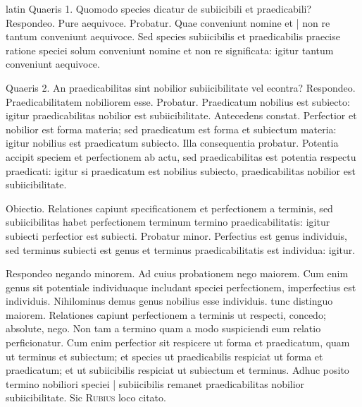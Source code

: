 \begin{otherlanguage*}{latin}
\pstart
 Quaeris 1. Quomodo species dicatur de subiicibili et praedicabili? Respondeo. Pure aequivoce. Probatur. Quae conveniunt nomine et \textnormal{|}   non re tantum conveniunt aequivoce. Sed species subiicibilis et praedicabilis praecise ratione speciei solum conveniunt nomine et non re significata: igitur tantum conveniunt aequivoce. 
\pend

\pstart
 Quaeris 2. An praedicabilitas sint nobilior subiicibilitate vel econtra? Respondeo. Praedicabilitatem nobiliorem esse. Probatur. Praedicatum nobilius est subiecto: igitur praedicabilitas nobilior est subiicibilitate. Antecedens constat. Perfectior et nobilior est forma materia; sed praedicatum est forma et subiectum materia: igitur nobilius est praedicatum subiecto. Illa consequentia probatur. Potentia accipit speciem et perfectionem ab actu, sed praedicabilitas est potentia respectu praedicati: igitur si praedicatum est nobilius subiecto, praedicabilitas nobilior est subiicibilitate. 
\pend

\pstart
 Obiectio. Relationes capiunt specificationem et perfectionem a terminis, sed subiicibilitas habet perfectionem terminum termino praedicabilitatis: igitur subiecti perfectior est subiecti. Probatur minor. Perfectius est genus individuis, sed terminus subiecti est genus et terminus praedicabilitatis est individua: igitur. 
\pend

\pstart
 Respondeo negando minorem. Ad cuius probationem nego maiorem. Cum enim genus sit potentiale individuaque includant speciei perfectionem, imperfectius est individuis. Nihilominus demus genus nobilius esse individuis.  tunc distinguo maiorem. Relationes capiunt perfectionem a terminis ut respecti, concedo; absolute, nego. Non tam a termino quam a modo suspiciendi eum relatio perficionatur. Cum enim perfectior sit respicere ut forma et praedicatum, quam ut terminus et subiectum; et species ut praedicabilis respiciat ut forma et praedicatum; et ut subiicibilis respiciat ut subiectum et terminus. Adhuc posito termino nobiliori speciei \textnormal{|} subiicibilis remanet praedicabilitas nobilior subiicibilitate. Sic \textsc{Rubius} loco citato. 
\pend

        \pstart
        \pend
      

\end{otherlanguage*}
